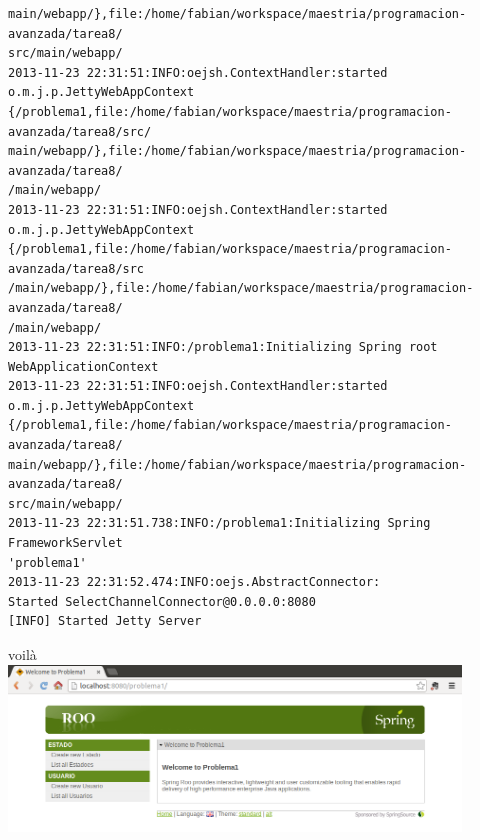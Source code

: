 \documentclass[12pt]{article}
\begin{document}
\begin{enumerate}
\begin{lstlisting}[frame=single]
main/webapp/},file:/home/fabian/workspace/maestria/programacion-avanzada/tarea8/
src/main/webapp/
2013-11-23 22:31:51:INFO:oejsh.ContextHandler:started o.m.j.p.JettyWebAppContext
{/problema1,file:/home/fabian/workspace/maestria/programacion-avanzada/tarea8/src/
main/webapp/},file:/home/fabian/workspace/maestria/programacion-avanzada/tarea8/
/main/webapp/
2013-11-23 22:31:51:INFO:oejsh.ContextHandler:started o.m.j.p.JettyWebAppContext
{/problema1,file:/home/fabian/workspace/maestria/programacion-avanzada/tarea8/src
/main/webapp/},file:/home/fabian/workspace/maestria/programacion-avanzada/tarea8/
/main/webapp/
2013-11-23 22:31:51:INFO:/problema1:Initializing Spring root WebApplicationContext
2013-11-23 22:31:51:INFO:oejsh.ContextHandler:started o.m.j.p.JettyWebAppContext
{/problema1,file:/home/fabian/workspace/maestria/programacion-avanzada/tarea8/
main/webapp/},file:/home/fabian/workspace/maestria/programacion-avanzada/tarea8/
src/main/webapp/
2013-11-23 22:31:51.738:INFO:/problema1:Initializing Spring FrameworkServlet 
'problema1'
2013-11-23 22:31:52.474:INFO:oejs.AbstractConnector:
Started SelectChannelConnector@0.0.0.0:8080
[INFO] Started Jetty Server
\end{lstlisting}

voilà\\
\includegraphics[width=12cm]{Screen.png}

\end{enumerate}
\end{document}
